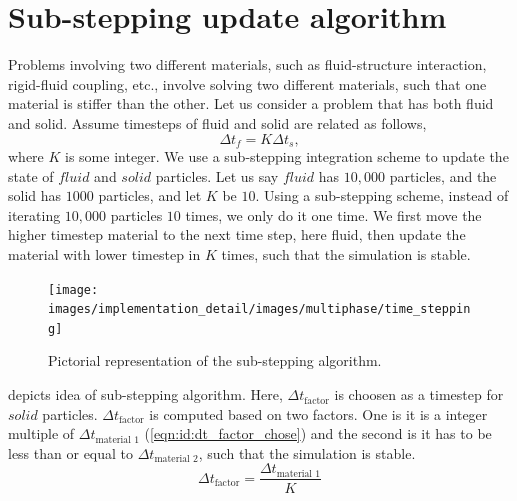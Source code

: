 \section{Sub-stepping update algorithm}
\label{sec:substepping-algorithm}
Problems involving two different materials, such as fluid-structure interaction,
rigid-fluid coupling, etc., involve solving two different materials, such that
one material is stiffer than the other. Let us consider a problem that has both
fluid and solid. Assume timesteps of fluid and solid are related as follows,
\begin{equation}
\Delta t_f = K \Delta t_s,
\end{equation}
where $K$ is some integer. We use a sub-stepping integration scheme to update
the state of $fluid$ and $solid$ particles. Let us say $fluid$ has $10,000$
particles, and the solid has $1000$ particles, and let $K$ be $10$. Using a
sub-stepping scheme, instead of iterating $10,000$ particles $10$ times, we only
do it one time. We first move the higher timestep material to the next time
step, here fluid, then update the material with lower timestep in $K$ times,
such that the simulation is stable.
\begin{figure}[!htpb]
  \centering
  \texttt{[image: images/implementation\_detail/images/multiphase/time\_stepping]}
  \caption{Pictorial representation of the sub-stepping algorithm.}
\label{fig:id:multiphase}
\end{figure}
 depicts idea of sub-stepping algorithm. Here,
$\Delta t_{\text{factor}}$ is choosen as a timestep for $solid$ particles.
$\Delta t_{\text{factor}}$ is computed based on two factors. One is it is a
integer multiple of $\Delta t_{\text{material 1}}$
(\cref{eqn:id:dt_factor_chose}) and the second is it has to be less than or
equal to $\Delta t_{\text{material 2}}$, such that the simulation is stable.
\begin{equation}
\label{eqn:id:dt_factor_chose}
\Delta t_{\text{factor}} = \frac{\Delta t_{\text{material 1}}}{K}
\end{equation}


\FloatBarrier%
